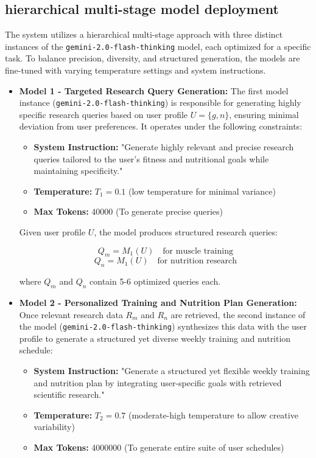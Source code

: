 \documentclass[conference]{IEEEtran}
\begin{document}
\subsection{hierarchical multi-stage model deployment}
The system utilizes a hierarchical multi-stage approach with three distinct instances of the \texttt{gemini-2.0-flash-thinking} model, each optimized for a specific task. To balance precision, diversity, and structured generation, the models are fine-tuned with varying temperature settings and system instructions.

\begin{itemize}
    \item \textbf{Model 1 - Targeted Research Query Generation:}  
    The first model instance (\texttt{gemini-2.0-flash-thinking}) is responsible for generating highly specific research queries based on user profile $U = \{g, n\}$, ensuring minimal deviation from user preferences. It operates under the following constraints:

    \begin{itemize}
        \item \textbf{System Instruction:} "Generate highly relevant and precise research queries tailored to the user's fitness and nutritional goals while maintaining specificity."
        \item \textbf{Temperature:} $T_1 = 0.1$ (low temperature for minimal variance)
        \item \textbf{Max Tokens:} 40000 (To generate precise queries)
    \end{itemize}

    Given user profile $U$, the model produces structured research queries:
    
    \[
    Q_m = M_1(U) \quad \text{for muscle training}
    \]
    \[
    Q_n = M_1(U) \quad \text{for nutrition research}
    \]

    where $Q_m$ and $Q_n$ contain 5-6 optimized queries each.

    \item \textbf{Model 2 - Personalized Training and Nutrition Plan Generation:}  
    Once relevant research data $R_m$ and $R_n$ are retrieved, the second instance of the model (\texttt{gemini-2.0-flash-thinking}) synthesizes this data with the user profile to generate a structured yet diverse weekly training and nutrition schedule:

    \begin{itemize}
        \item \textbf{System Instruction:} "Generate a structured yet flexible weekly training and nutrition plan by integrating user-specific goals with retrieved scientific research."
        \item \textbf{Temperature:} $T_2 = 0.7$ (moderate-high temperature to allow creative variability)
        \item \textbf{Max Tokens:} 4000000 (To generate entire suite of user schedules)
    \end{itemize}


\end{itemize}
\end{document}
